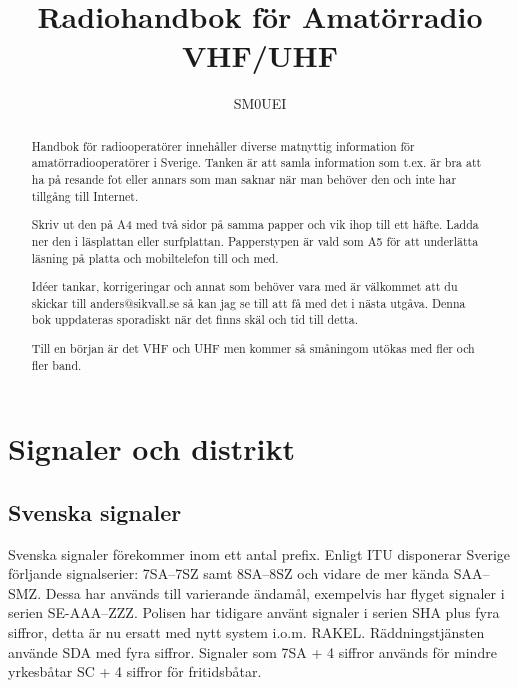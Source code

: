
\title{Radiohandbok för Amatörradio\\
VHF/UHF}
\author{SM0UEI}
\maketitle

\begin{abstract}
Handbok för radiooperatörer innehåller diverse matnyttig information för amatörradiooperatörer i Sverige. Tanken är att samla information som t.ex. är bra att ha på resande fot eller annars som man saknar när man behöver den och inte har tillgång till Internet.

Skriv ut den på A4 med två sidor på samma papper och vik ihop till ett häfte. Ladda ner den i läsplattan eller surfplattan. Papperstypen är vald som A5 för att underlätta läsning på platta och mobiltelefon till och med.

Idéer tankar, korrigeringar och annat som behöver vara med är väl\-kom\-met att du skickar till anders@sikvall.se så kan jag se till att få med det i nästa utgåva. Denna bok uppdateras sporadiskt när det finns skäl och tid till detta.

Till en början är det VHF och UHF men kommer så småningom utökas med fler och fler band.
\end{abstract}

\clearpage
\tableofcontents
\clearpage

\setlength{\parskip}{0.5em}
\setlength{\parindent}{0pt}


\section{Signaler och distrikt}

\subsection{Svenska signaler}

Svenska signaler förekommer inom ett antal prefix. Enligt ITU disponerar Sverige förljande signalserier:
7SA--7SZ samt 8SA--8SZ och vidare de mer kända SAA--SMZ. Dessa har används till varierande ändamål, exempelvis har flyget signaler i serien SE-AAA--ZZZ. Polisen har tidigare använt signaler i serien SHA plus fyra siffror, detta är nu ersatt med nytt system i.o.m. RAKEL. Räddningstjänsten använde SDA med fyra siffror. Signaler som 7SA + 4 siffror används för mindre yrkesbåtar SC + 4 siffror för fritidsbåtar.

